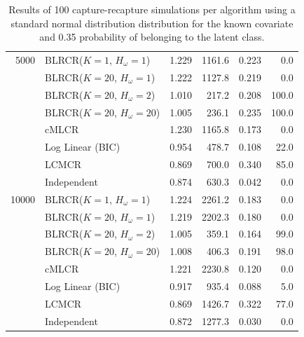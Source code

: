 \documentclass[
  12pt,
]{article}
\begin{document}
\begin{table}[H]
\begin{tabular}{||r l r r r r||}
 5000          & BLRCR($K=1$, $H_\omega=1$)  & 1.229   & 1161.6   & 0.223   & 0.0 \\ 
               & BLRCR($K=20$, $H_\omega=1$)    & 1.222     & 1127.8     & 0.219     & 0.0 \\ 
               & BLRCR($K=20$, $H_\omega=2$)    & 1.010     & 217.2     & 0.208     & 100.0 \\
               & BLRCR($K=20$, $H_\omega=20$)    & 1.005     & 236.1     & 0.235     & 100.0 \\ 
               & cMLCR       & 1.230       & 1165.8      & 0.173      & 0.0 \\
               & Log Linear (BIC)  & 0.954      & 478.7     & 0.108     & 22.0 \\ 
               & LCMCR       & 0.869       & 700.0      & 0.340      & 85.0 \\ 
               & Independent & 0.874 & 630.3& 0.042& 0.0 \\ 

 \hline
 


 10000          & BLRCR($K=1$, $H_\omega=1$)  & 1.224   & 2261.2   & 0.183   & 0.0 \\ 
               & BLRCR($K=20$, $H_\omega=1$)    & 1.219     & 2202.3     & 0.180     & 0.0 \\ 
               & BLRCR($K=20$, $H_\omega=2$)    & 1.005     & 359.1     & 0.164     & 99.0 \\
               & BLRCR($K=20$, $H_\omega=20$)    & 1.008     & 406.3     & 0.191     & 98.0 \\ 
               & cMLCR       & 1.221       & 2230.8      & 0.120      & 0.0 \\
               & Log Linear (BIC)  & 0.917      & 935.4     & 0.088     & 5.0 \\ 
               & LCMCR       & 0.869       & 1426.7      & 0.322      & 77.0 \\ 
               & Independent & 0.872 & 1277.3& 0.030& 0.0 \\ 

 \hline
\end{tabular}
\caption{Results of 100 capture-recapture simulations per algorithm using a standard normal distribution distribution for the known covariate and 0.35 probability of belonging to the latent class.}
\label{table:heterodist}
\end{table}
\doublespacing
\end{document}
